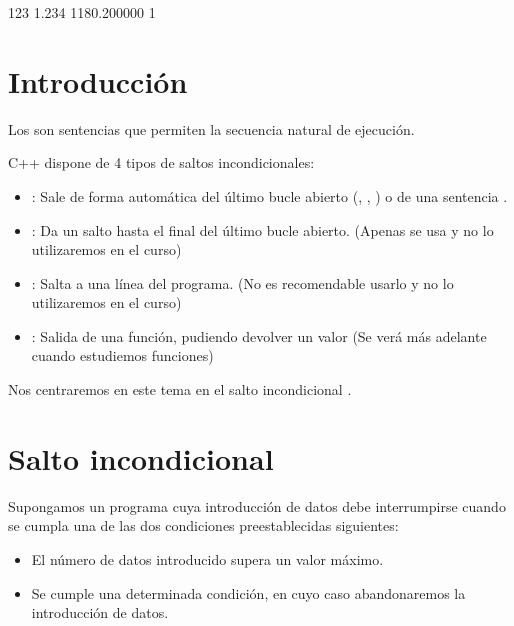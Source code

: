 \documentclass[letterpaper,10pt,english]{sphinxmanual}
\begin{document}
\begin{sphinxVerbatim}[commandchars=\\\{\}]
  123          1.234
1180.200000              1
\end{sphinxVerbatim}


\section{Introducción}
\label{\detokenize{introduccion:introduccion}}\label{\detokenize{introduccion::doc}}
Los  son sentencias que permiten 
la secuencia natural de ejecución.

C++ dispone de 4 tipos de saltos incondicionales:
\begin{itemize}
\item {} 
: Sale de forma automática del último bucle abierto
(, , ) o de una sentencia .

\item {} 
: Da un salto hasta el final del último bucle abierto.
(Apenas se usa y no lo utilizaremos en el curso)

\item {} 
: Salta a una línea  del programa.
(No es recomendable usarlo y no lo utilizaremos en el curso)

\item {} 
: Salida de una función, pudiendo devolver un valor
(Se verá más adelante cuando estudiemos funciones)

\end{itemize}

Nos centraremos en este tema en el salto incondicional .


\section{Salto incondicional }
\label{\detokenize{break:salto-incondicional-break}}\label{\detokenize{break::doc}}
Supongamos un programa cuya introducción de datos debe interrumpirse
cuando se cumpla una de las dos
condiciones preestablecidas siguientes:
\begin{itemize}
\item {} 
El número de datos introducido supera un valor máximo.

\item {} 
Se cumple una determinada condición, en cuyo caso abandonaremos la
introducción de datos.

\end{itemize}
\end{document}
